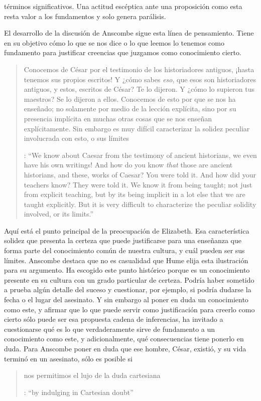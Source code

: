 términos significativos. Una actitud escéptica ante una proposición como esta resta valor a los fundamentos y solo genera parálisis.

El desarrollo de la discusión de Anscombe sigue esta línea de pensamiento. Tiene en su objetivo cómo lo que se nos dice o lo que leemos lo tenemos como fundamento para justificar creencias que juzgamos como conocimiento cierto.

\blockquote[{\cite[90]{anscombe1981parmenides:humeandjulius}}: \enquote{We know about Caesar from the testimony of ancient historians, we even have his own writings! And how do you know \emph{that} those are ancient historians, and these, works of Caesar? You were told it. And how did your teachers know? They were told it. We know it from being taught; not just from explicit teaching, but by its being implicit in a lot else that we are taught explicitly. But it is very difficult to characterize the peculiar solidity involved, or its limits.}]{Conocemos de César por el testimonio de los historiadores antiguos, ¡hasta tenemos sus propios escritos! Y ¿cómo sabes \emph{eso}, que esos son historiadores antiguos, y estos, escritos de César? Te lo dijeron. Y ¿cómo lo supieron tus maestros? Se lo dijeron a ellos. Conocemos de esto por que se nos ha enseñado; no solamente por medio de la lección explícita, sino por su presencia implícita en muchas otras cosas que se nos enseñan explícitamente. Sin embargo es muy difícil caracterizar la solidez peculiar involucrada con esto, o sus límites}. Aquí está el punto principal de la preocupación de Elizabeth. Esa característica solidez que presenta la certeza que puede justificarse para una enseñanza que forma parte del conocimiento común de nuestra cultura, y cuál pueden ser sus límites. Anscombe destaca que no es casualidad que Hume elija esta ilustración para su argumento. Ha escogido este punto histórico porque es un conocimiento presente en su cultura con un grado particular de certeza. Podría haber sometido a prueba algún detalle del suceso y cuestionar, por ejemplo, si podría dudarse la fecha o el lugar del asesinato. Y sin embargo al poner en duda un conocimiento como este, y afirmar que lo que puede servir como justificación para creerlo como cierto sólo puede ser esa propuesta cadena de inferencias, ha invitado a cuestionarse qué es lo que verdaderamente sirve de fundamento a un conocimiento como este, y adicionalmente, qué consecuencias tiene ponerlo en duda. Para Anscombe poner en duda que ese hombre, César, existió, y su vida terminó en un asesinato, sólo es posible si \blockquote[{\cite[Cf.~][90]{anscombe1981parmenides:humeandjulius}}: \enquote{by indulging in Cartesian doubt}]{nos permitimos el lujo de la duda cartesiana}.


